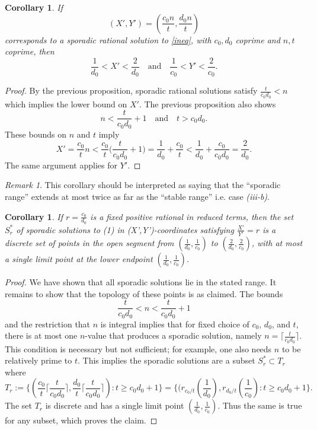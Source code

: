 \documentclass[12pt,letterpaper, reqno]{amsart}
\newtheorem{cor}[thm]{Corollary}
\theoremstyle{definition}
\theoremstyle{remark}
\newtheorem{rmk}[thm]{Remark}
\newcommand{\ceil}[1]{\lceil{#1}\rceil}
\begin{document}
\begin{cor}
If
\[ (X',Y') = (\frac{c_0n}{t}, \frac{d_0n}{t})\]
corresponds to a sporadic rational solution to \eqref{ineq}, with $c_0,d_0$ coprime and $n,t$ coprime, then
\[ \frac{1}{d_0} < X' < \frac{2}{d_0} \quad\text{and}\quad \frac{1}{c_0} < Y' < \frac{2}{c_0}.\]
\end{cor}
\begin{proof}
By the previous proposition, sporadic rational solutions satisfy $\frac{t}{c_0d_0} < n$ which implies the lower bound on $X'$.
The previous proposition also shows
\[ n < \frac{t}{c_0d_0}+1 \quad\text{and}\quad t > c_0d_0.\]
These bounds on $n$ and $t$ imply
\[ X' = \frac{c_0}{t}n < \frac{c_0}{t}\bigg(\frac{t}{c_0d_0}+1\bigg) = \frac1{d_0} + \frac{c_0}{t} < \frac1{d_0} + \frac{c_0}{c_0d_0} = \frac2{d_0}.\]
The same argument applies for $Y'$.
\end{proof}

\begin{rmk}
This corollary should be interpreted as saying that the ``sporadic range'' extends at most twice as far as the ``stable range'' i.e. case {\it(iii-b)}.
\end{rmk}

\begin{cor}\label{cor:sporadic-bound}
If $r=\frac{c_0}{d_0}$ is a fixed positive rational in reduced terms, then the set $S^*_r$ of sporadic solutions to (1) in (X',Y')-coordinates satisfying $\frac{X'}{Y'}=r$ is a discrete set of points in the open segment from $(\frac{1}{d_0},\frac{1}{c_0})$ to $(\frac{2}{d_0},\frac{2}{c_0})$, with at most a single limit point at the lower endpoint $(\frac{1}{d_0},\frac{1}{c_0})$.
\end{cor}
\begin{proof}
We have shown that all sporadic solutions lie in the stated range. It remains to show that the topology of these points is as claimed.
The bounds
\[ \frac{t}{c_0d_0} < n < \frac{t}{c_0d_0} + 1\]
and the restriction that $n$ is integral implies that for fixed choice of $c_0$, $d_0$, and $t$, there is at most one $n$-value that produces a sporadic solution, namely $n = \ceil{\frac{t}{c_0d_0}}$. This condition is necessary but not sufficient; for example, one also needs $n$ to be relatively prime to $t$. This implies the sporadic solutions are a subset $S_r^*  \subset T_r$ where
\[ T_r := \{ (\frac{c_0}{t}\ceil{\frac{t}{c_0d_0}}, \frac{d_0}{t}\ceil{\frac{t}{c_0d_0}}) : t \geq c_0d_0 + 1\} = \{ (r_{c_0/t}(\frac1{d_0}), r_{d_0/t}(\frac{1}{c_0}) : t\geq c_0d_0+1\}.\]
The set $T_r$ is discrete and has a single limit point $(\frac{1}{d_0},\frac{1}{c_0})$. Thus the same is true for any subset, which proves the claim.
\end{proof}
\end{document}
